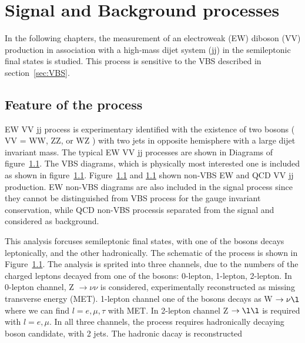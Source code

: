 \chapter{Signal and Background processes}
\label{chap:sigbkg}
In the following chapters, the measurement of an electroweak (EW) diboson (VV) production in association with a high-mass dijet system (jj) in the semileptonic final states is studied.
This process is sensitive to the VBS described in section~\ref{sec:VBS}.
\section{Feature of the process}
EW VV jj process is experimentary identified with the existence of two bosons ( VV = WW, ZZ, or WZ ) with two jets in opposite hemisphere with a large dijet invariant mass.
The typical EW VV jj processes are shown in Diagrams of figure~\ref{}.
The VBS diagrams, which is physically most interested one is included as shown in figure~\ref{}. Figure~\ref{} and \ref{} shown non-VBS EW and QCD VV jj production. EW non-VBS diagrams are also included in the signal process since they cannot be distinguished from VBS process for the gauge invariant conservation, while QCD non-VBS processis separated from the signal and considered as background.


This analysis forcuses semileptonic final states, with one of the bosons decays leptonically, and the other hadronically. 
The schematic of the process is shown in Figure~\ref{}.
The analysis is sprited into three channels, due to the numbers of the charged leptons decayed from one of the bosons: 0-lepton, 1-lepton, 2-lepton. 
In 0-lepton channel, Z $\rightarrow \nu \nu$ is considered, experimentally reconstructed as missing transverse energy (MET). 1-lepton channel one of the bosons decays as W $\rightarrow \nu \l$ where we can find $l = e, \mu, \tau$ with MET. In 2-lepton channel Z $\rightarrow \l \l$ is required with $l = e, \mu$. 
In all three channels, the process requires hadronically decaying boson candidate, with 2 jets. The hadronic dacay is reconstructed  


